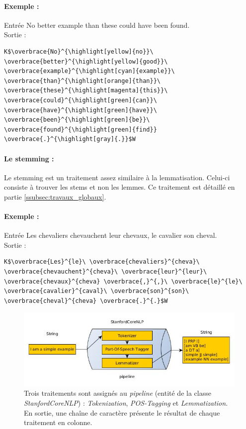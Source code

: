                 \paragraph{Exemple :}
                Entrée \og No better example than these could have been found.\fg\\
                Sortie :
\begin{lstlisting}
K$\overbrace{No}^{\highlight[yellow]{no}}\ \overbrace{better}^{\highlight[yellow]{good}}\ \overbrace{example}^{\highlight[cyan]{example}}\ \overbrace{than}^{\highlight[orange]{than}}\ \overbrace{these}^{\highlight[magenta]{this}}\ \overbrace{could}^{\highlight[green]{can}}\ \overbrace{have}^{\highlight[green]{have}}\ \overbrace{been}^{\highlight[green]{be}}\ \overbrace{found}^{\highlight[green]{find}} \overbrace{.}^{\highlight[gray]{.}}$W
\end{lstlisting}

                \paragraph{Le stemming :}
                Le stemming est un traitement assez similaire à la lemmatisation. Celui-ci consiste à trouver les stems et non les lemmes. Ce traitement est détaillé en partie \ref{ssubsec:travaux_globaux}.

                \paragraph{Exemple :}
                Entrée \og Les chevaliers chevauchent leur chevaux, le cavalier son cheval.\fg\\
                Sortie :
\begin{lstlisting}
K$\overbrace{Les}^{le}\ \overbrace{chevaliers}^{cheva}\ \overbrace{chevauchent}^{cheva}\ \overbrace{leur}^{leur}\ \overbrace{chevaux}^{cheva} \overbrace{,}^{,}\ \overbrace{le}^{le}\ \overbrace{cavalier}^{caval}\ \overbrace{son}^{son}\ \overbrace{cheval}^{cheva} \overbrace{.}^{.}$W
\end{lstlisting}

            \begin{figure}[h!]
                \centering
                \includegraphics[width=\textwidth]{images/coreNLP.jpg}
                \caption{Trois traitements sont assignés au \textit{pipeline} (entité de la classe \textit{StanfordCoreNLP}) : \textit{Tokenization}, \textit{POS-Tagging} et \textit{Lemmatization}. En sortie, une chaîne de caractère présente le résultat de chaque traitement en colonne.}
                \label{fig:coreNLP}
            \end{figure}

